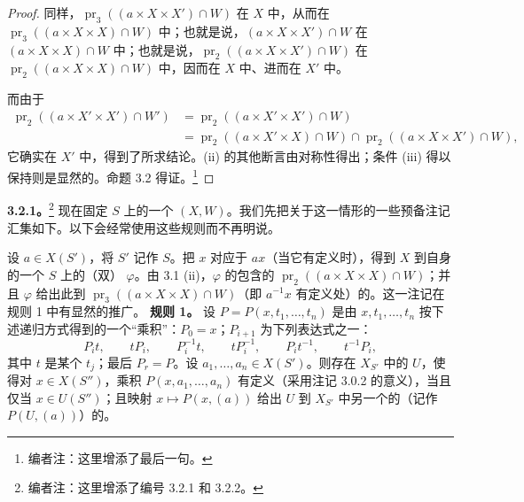 \begin{proof}
同样，$\operatorname{pr}_3((a\times X\times X')\cap W)$ 在 $X$ 中，从而在 $\operatorname{pr}_3((a\times X\times X)\cap W)$ 中；也就是说，$(a\times X\times X')\cap W$ 在 $(a\times X\times X)\cap W$ 中；也就是说，$\operatorname{pr}_2((a\times X\times X')\cap W)$ 在 $\operatorname{pr}_2((a\times X\times X)\cap W)$ 中，因而在 $X$ 中、进而在 $X'$ 中。

而由于
\[
\begin{aligned}
\operatorname{pr}_2((a\times X'\times X')\cap W')
&=\operatorname{pr}_2((a\times X'\times X')\cap W)\\
&=\operatorname{pr}_2((a\times X'\times X)\cap W)\cap\operatorname{pr}_2((a\times X\times X')\cap W),
\end{aligned}
\]
它确实在 $X'$ 中，得到了所求结论。(ii) 的其他断言由对称性得出；条件 (iii) 得以保持则是显然的。命题 3.2 得证。\footnote{编者注：这里增添了最后一句。}
\end{proof}
\textbf{3.2.1。}\footnote{编者注：这里增添了编号 3.2.1 和 3.2.2。} 现在固定 $S$ 上的一个 $(X,W)$。我们先把关于这一情形的一些预备注记汇集如下。以下会经常使用这些规则而不再明说。

设 $a\in X(S')$，将 $S'$ 记作 $S$。把 $x$ 对应于 $ax$（当它有定义时），得到 $X$ 到自身的一个 $S$ 上的（双） $\varphi$。由 3.1 (ii)，$\varphi$ 的包含的 $\operatorname{pr}_2((a\times X\times X)\cap W)$；并且 $\varphi$ 给出此到 $\operatorname{pr}_3((a\times X\times X)\cap W)$（即 $a^{-1}x$ 有定义处）的。这一注记在规则 1 中有显然的推广。
\textbf{规则 1。} 设 $P=P(x,t_1,\ldots,t_n)$ 是由 $x,t_1,\ldots,t_n$ 按下述递归方式得到的一个“乘积”：$P_0=x$；$P_{i+1}$ 为下列表达式之一：
\[
P_i t,\qquad tP_i,\qquad P_i^{-1}t,\qquad tP_i^{-1},\qquad P_i t^{-1},\qquad t^{-1}P_i,
\]
其中 $t$ 是某个 $t_j$；最后 $P_r=P$。设 $a_1,\ldots,a_n\in X(S')$。则存在 $X_{S'}$ 中的 $U$，使得对 $x\in X(S'')$，乘积 $P(x,a_1,\ldots,a_n)$ 有定义（采用注记 3.0.2 的意义），当且仅当 $x\in U(S'')$；且映射 $x\mapsto P(x,(a))$ 给出 $U$ 到 $X_{S'}$ 中另一个的（记作 $P(U,(a))$）的。

